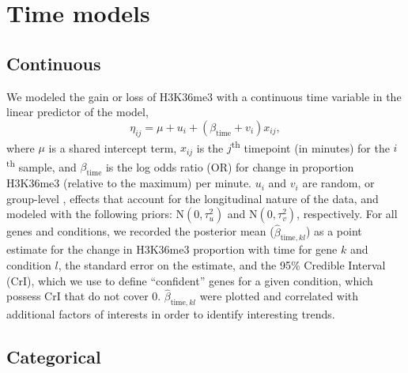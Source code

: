 \documentclass[12pt]{extarticle}
\begin{document}
\section*{Time models}

\subsection*{Continuous}

We modeled the gain or loss of H3K36me3 with a continuous time variable in the linear predictor of the model, 
\begin{equation}
	\eta_{ij} = \mu + u_{i} + (\beta_{\text{time}} + v_{i})x_{ij},
\end{equation}
where $\mu$ is a shared intercept term, $x_{ij}$ is the $j$\textsuperscript{th} timepoint (in minutes) for the $i$\textsuperscript{th} sample, and $\beta_{\text{time}}$ is the log odds ratio (OR) for change in proportion H3K36me3 (relative to the maximum) per minute. $u_{i}$ and $v_{i}$ are random, or group-level \cite{Gelman2006}, effects that account for the longitudinal nature of the data, and modeled with the following priors: $\text{N}(0, \tau^{2}_{u})$ and $\text{N}(0, \tau^{2}_{v})$, respectively. For all genes and conditions, we recorded the posterior mean ($\widehat{\beta}_{\text{time}, kl}$) as a point estimate for the change in H3K36me3 proportion with time for gene $k$ and condition $l$, the standard error on the estimate, and the 95\% Credible Interval (CrI), which we use to define ``confident'' genes for a given condition, which possess CrI that do not cover 0. $\widehat{\beta}_{\text{time}, kl}$ were plotted and correlated with additional factors of interests in order to identify interesting trends.

\subsection*{Categorical}
\end{document}
